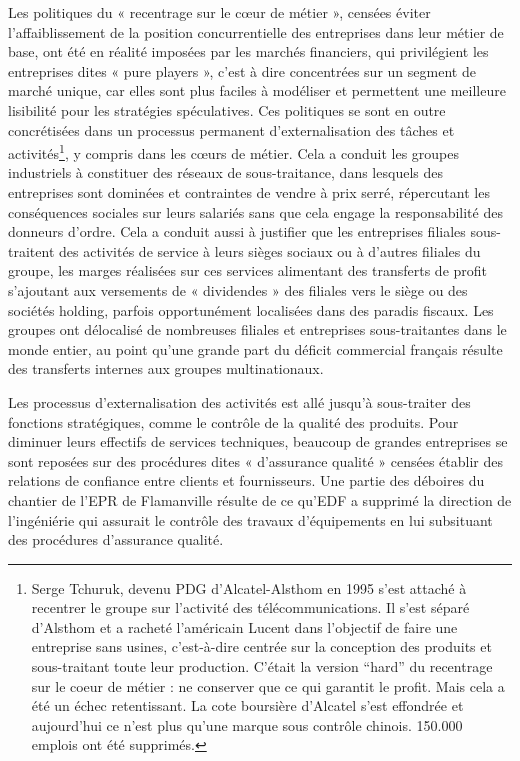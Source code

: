 \documentclass[a4paper]{article}
\begin{document}
Les politiques du « recentrage sur le cœur de métier », censées éviter l’affaiblissement de la position concurrentielle des entreprises dans leur métier de base,  ont été en réalité imposées par les marchés financiers, qui privilégient les entreprises dites « pure players », c’est à dire concentrées sur un segment de marché unique, car elles sont plus faciles à modéliser et permettent une meilleure lisibilité pour les stratégies spéculatives. Ces politiques se sont en outre concrétisées dans un processus permanent d’externalisation des tâches et activités\footnote{Serge Tchuruk, devenu PDG d’Alcatel-Alsthom en 1995 s’est attaché à recentrer le groupe sur l’activité des télécommunications. Il s’est séparé d’Alsthom et a racheté l’américain Lucent dans l’objectif de faire une entreprise sans usines, c’est-à-dire centrée sur la conception des produits et sous-traitant toute leur production. C’était la version “hard” du recentrage sur le coeur de métier : ne conserver que ce qui garantit le profit. Mais cela a été un échec retentissant. La cote boursière d’Alcatel s’est effondrée et aujourd’hui ce n’est plus qu’une marque sous contrôle chinois. 150.000 emplois ont été supprimés.}, y compris dans les cœurs de métier. Cela a conduit les groupes industriels à constituer des réseaux de sous-traitance, dans lesquels des entreprises sont dominées et contraintes de vendre à prix serré, répercutant les conséquences sociales sur leurs salariés sans que cela engage la responsabilité des donneurs d’ordre. Cela a conduit aussi à justifier que les entreprises filiales sous-traitent des activités de service à leurs sièges sociaux ou à d’autres filiales du groupe, les marges réalisées sur ces services alimentant des transferts de profit s’ajoutant aux versements de « dividendes » des filiales vers le siège ou des sociétés holding, parfois opportunément localisées dans des paradis fiscaux. Les groupes ont délocalisé de nombreuses filiales et entreprises sous-traitantes dans le monde entier, au point qu’une grande part du déficit commercial français résulte des transferts internes aux groupes multinationaux.

Les processus d’externalisation des activités est allé jusqu’à sous-traiter des fonctions stratégiques, comme le contrôle de la qualité des produits. Pour diminuer leurs effectifs de services techniques, beaucoup de grandes entreprises se sont reposées sur des procédures dites « d’assurance qualité » censées établir des relations de confiance entre clients et fournisseurs. Une partie des déboires du chantier de l’EPR de Flamanville résulte de ce qu’EDF a supprimé la direction de l’ingéniérie qui assurait le contrôle des travaux d’équipements en lui subsituant des procédures d’assurance qualité.
\end{document}
